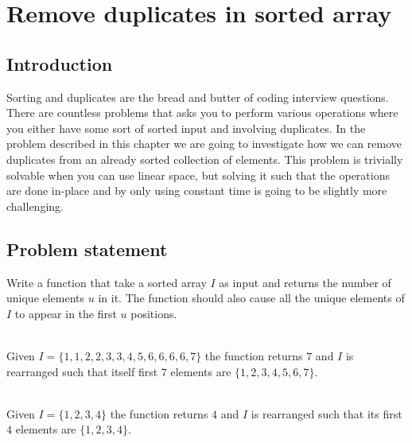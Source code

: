 %



\chapter{Remove duplicates in sorted array}
\label{ch:remove_duplicated_sorted_array_inplace}
\section*{Introduction}
Sorting and duplicates are the bread and butter of coding interview questions. There are countless
problems that asks you to perform various operations where you either have some sort of sorted input
and involving duplicates. In the problem described in this chapter we are going to investigate how
we can remove duplicates from an already sorted collection of elements. This problem is trivially
solvable when you can use linear space, but solving it such that the operations are done in-place
and by only using constant time is going to be slightly more challenging.


\section{Problem statement}
\begin{exercise}
Write a function that take a sorted array $I$ as input and  returns the number of unique elements
$u$ in it. The function should also cause all the unique elements of $I$ to appear in the first $u$
positions.

\label{example:remove_duplicated_sorted_array_inplace:exercice1}

	\begin{example}
		\label{example:remove_duplicated_sorted_array_inplace:example1}
		\hfill \\
		Given $I=\{1,1,2,2,3,3,4,5,6,6,6,6,7\}$ the function returns $7$ and $I$ is rearranged such
		that itself first $7$ elements are $\{1,2,3,4,5,6,7\}$.				
	\end{example}

	\begin{example}
		\label{example:remove_duplicated_sorted_array_inplace:example2}
		\hfill \\
		Given $I=\{1,2,3,4\}$ the function returns $4$ and $I$ is rearranged such that its first $4$
		elements are $\{1,2,3,4\}$.	
	\end{example}
\end{exercise}

